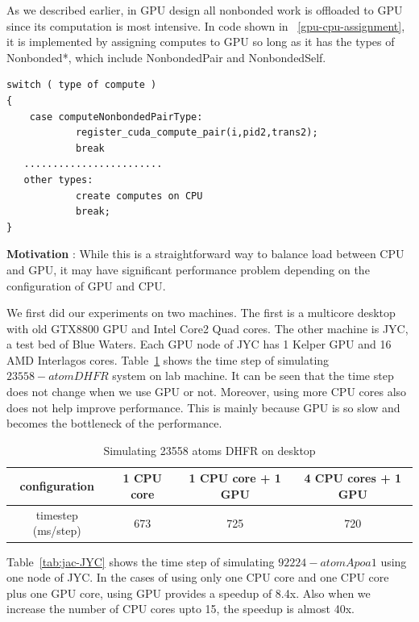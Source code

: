 As we described earlier, in \namd{} GPU design all nonbonded work 
is offloaded to GPU since its computation is most intensive.
In code shown in ~\ref{gpu-cpu-assignment}, it is implemented by assigning computes to GPU so long as 
it has the types of Nonbonded*, which include NonbondedPair and
NonbondedSelf.  

\begin{lstlisting}[frame=single,caption={Compute Assignment},label=gpu-cpu-assignment]
switch ( type of compute )    
{
    case computeNonbondedPairType:
            register_cuda_compute_pair(i,pid2,trans2);
            break
   ........................
   other types:
            create computes on CPU
            break;
}

\end{lstlisting}

\textbf{Motivation} : While this is a straightforward way to balance load between CPU and GPU, 
it may have significant performance problem depending on the configuration
of GPU and CPU.

We first did our experiments on two machines. The first is a multicore desktop with old GTX8800 
GPU and Intel Core2 Quad cores. The other machine is JYC, a test bed of Blue Waters. Each GPU node of 
JYC has 1 Kelper GPU and 16 AMD Interlagos cores. Table~\ref{tab:jac-desktop} shows the time step 
of simulating $23558-atom DHFR$ system on lab machine. It can be seen that the time step 
does not change when we use GPU or not. Moreover, using more CPU cores also does not help improve performance.
This is mainly because GPU is so slow and becomes the bottleneck of the performance.

\begin{table}
\centering
\begin{tabular}{|c|c|c|c|}
\hline
 configuration & 1 CPU core  & 1 CPU core + 1 GPU & 4 CPU cores + 1 GPU \\
\hline
timestep (ms/step) & 673 & 725 & 720 \\
\hline 
\end{tabular}
\caption{Simulating 23558 atoms DHFR on desktop}
\label{tab:jac-desktop}
\end{table}

Table~\ref{tab:jac-JYC} shows the time step of simulating $92224-atom Apoa1$
using one node of JYC. In the cases of using only one CPU core and one CPU core 
plus one GPU core, using GPU provides a speedup of 8.4x. 
Also when we increase the number of CPU cores upto 15, 
 the speedup is almost 40x.   

